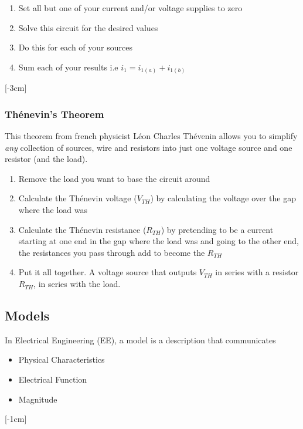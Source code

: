 \documentclass[12pt]{article}
\begin{document}
\begin{enumerate}
  \item Set all but one of your current and/or voltage supplies to zero
  \item Solve this circuit for the desired values 
  \item Do this for each of your sources
  \item Sum each of your results i.e $i_1=i_{1(a)}+i_{1(b)}$
\end{enumerate}
[-3cm]

\subsubsection{Th\'enevin's Theorem}
This theorem from french physicist Léon Charles Thévenin allows you to simplify \textit{any} collection of sources, wire and resistors into just one voltage source and one resistor (and the load).
\begin{enumerate}
  \item Remove the load you want to base the circuit around
  \item Calculate the Th\'enevin voltage ($V_{TH}$) by calculating the voltage over the gap where the load was
  \item Calculate the Th\'enevin resistance ($R_{TH}$) by pretending to be a current starting at one end in the gap where the load was and going to the other end, the resistances you pass through add to become the $R_{TH}$
  \item Put it all together. A voltage source that outputs $V_{TH}$ in series with a resistor $R_{TH}$, in series with the load.
\end{enumerate}

\subsection{Models}
In Electrical Engineering (EE), a model is a description that communicates

\begin{itemize}
  \item Physical Characteristics 
  \item Electrical Function
  \item Magnitude
\end{itemize}

[-1cm]
\end{document}
